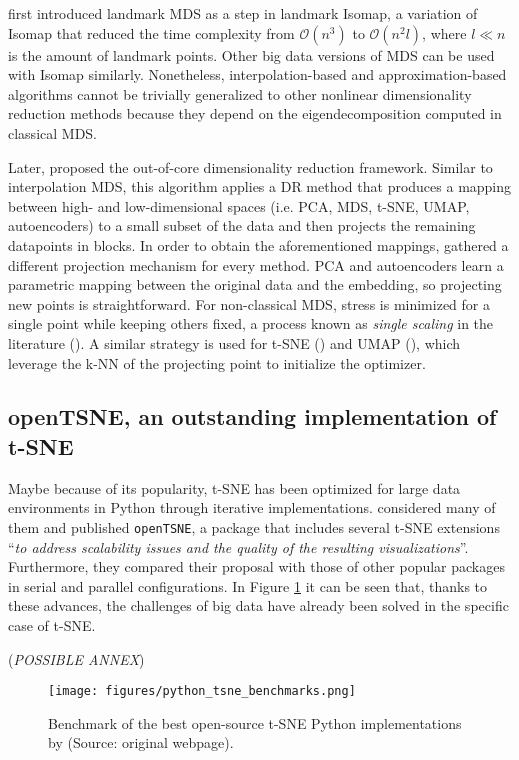 \citet{Silva2002} first introduced landmark MDS as a step in landmark Isomap, a variation of Isomap that reduced the time complexity from $\mathcal{O}(n^3)$ to $\mathcal{O}(n^2l)$, where $l \ll n$ is the amount of landmark points. Other big data versions of MDS can be used with Isomap similarly. Nonetheless, interpolation-based and approximation-based algorithms cannot be trivially generalized to other nonlinear dimensionality reduction methods because they depend on the eigendecomposition computed in classical MDS.

Later, \citet{Reichmann2024} proposed the out-of-core dimensionality reduction framework. Similar to interpolation MDS, this algorithm applies a DR method that produces a mapping between high- and low-dimensional spaces (i.e. PCA, MDS, t-SNE, UMAP, autoencoders) to a small subset of the data and then projects the remaining datapoints in blocks. In order to obtain the aforementioned mappings, \citet{Reichmann2024} gathered a different projection mechanism for every method. PCA and autoencoders learn a parametric mapping between the original data and the embedding, so projecting new points is straightforward. For non-classical MDS, stress is minimized for a single point while keeping others fixed, a process known as \textit{single scaling} in the literature (\cite{Basalaj1999}). A similar strategy is used for t-SNE (\cite{Zhang2021}) and UMAP (\cite{McInnes2018a}), which leverage the k-NN of the projecting point to initialize the optimizer.

\subsection{openTSNE, an outstanding implementation of t-SNE}
\label{sec:openTSNE}

Maybe because of its popularity, t-SNE has been optimized for large data environments in Python through iterative implementations. \citet{Policar2024} considered many of them and published \verb|openTSNE|, a package that includes several t-SNE extensions \enquote{\textit{to address scalability issues and the quality of the resulting visualizations}}. Furthermore, they compared their proposal with those of other popular packages in serial and parallel configurations. In Figure \ref{fig:python_tsne_benchmarks} it can be seen that, thanks to these advances, the challenges of big data have already been solved in the specific case of t-SNE.

(\textit{POSSIBLE ANNEX})

\begin{figure}[ht]
    \centering
    \texttt{[image: figures/python\_tsne\_benchmarks.png]}
    \caption{Benchmark of the best open-source t-SNE Python implementations by \cite{Poličar2023} (Source: original webpage).}
    \label{fig:python_tsne_benchmarks}
\end{figure}